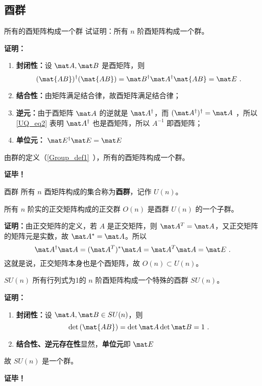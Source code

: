\subsection{酉群}
\begin{example}{所有的酉矩阵构成一个群}
试证明：所有 $n$ 阶酉矩阵构成一个群。

\textbf{证明：}
\begin{enumerate}
\item \textbf{封闭性：}设 $\mat A,\mat B$ 是酉矩阵，则
\begin{equation}
(\mat{AB})^\dagger(\mat{AB})=\mat B^\dagger \mat A^\dagger\mat{AB}=\mat E~.
\end{equation}
\item \textbf{结合性：}由矩阵满足结合律，故酉矩阵满足结合律；
\item \textbf{逆元：}由于酉矩阵 $\mat A$ 的逆就是 $\mat A^\dagger$，而 $(\mat A^\dagger)^\dagger=\mat A$ ，所以\autoref{UQ_eq2} 表明 $\mat A^\dagger$ 也是酉矩阵，所以 $A^{-1}$ 即酉矩阵；
\item \textbf{单位元：} $\mat E^\dagger\mat E=\mat E$
\end{enumerate}
由群的定义（\autoref{Group_def1}~），所有的酉矩阵构成一个群。

\textbf{证毕！}
\end{example}
\begin{definition}{酉群}
所有 $n$ 酉矩阵构成的集合称为\textbf{酉群}，记作 $U(n)$。
\end{definition}
\begin{theorem}{}
所有 $n$ 阶实的正交矩阵构成的正交群 $O(n)$ 是酉群 $U(n)$ 的一个子群。
\end{theorem}
\textbf{证明：}由正交矩阵的定义，若 $A$ 是正交矩阵，则 $\mat A^T=\mat A$，又正交矩阵的矩阵元是实数，故 $\mat A^*=\mat A$。所以
\begin{equation}
\mat A^\dagger\mat A=(\mat A^T)^*\mat A=\mat A^T\mat A=\mat E~.
\end{equation}
这就是说，正交矩阵本身也是个酉矩阵，故 $O(n)\subset U(n)$。
\begin{theorem}{$SU(n)$}
所有行列式为1的 $n$ 阶酉矩阵构成一个特殊的酉群 $SU(n)$。
\end{theorem}
\textbf{证明：}
\begin{enumerate}
\item \textbf{封闭性：}设 $\mat A,\mat B\in SU(n)$，则
\begin{equation}
\det{(\mat{AB})}=\det{\mat A}\det{\mat B}=1~.
\end{equation}
\item \textbf{结合性、逆元存在性}显然，\textbf{单位元}即 $\mat E$
\end{enumerate}
故 $SU(n)$ 是一个群。

\textbf{证毕！}